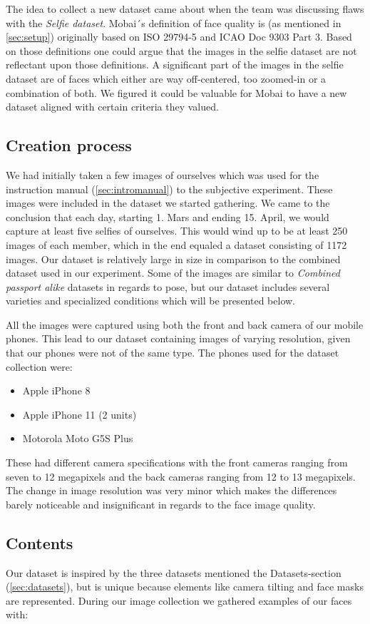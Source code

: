 The idea to collect a new dataset came about when the team was discussing flaws with the \textit{Selfie dataset}. Mobai´s definition of face quality is (as mentioned in \ref{sec:setup}) originally based on ISO 29794-5 and ICAO Doc 9303 Part 3. Based on those definitions one could argue that the images in the selfie dataset are not reflectant upon those definitions. A significant part of the images in the selfie dataset are of faces which either are way off-centered, too zoomed-in or a combination of both. We figured it could be valuable for Mobai to have a new dataset aligned with certain criteria they valued. 

\subsection*{Creation process}
We had initially taken a few images of ourselves which was used for the instruction manual (\ref{sec:intromanual}) to the subjective experiment. These images were included in the dataset we started gathering. We came to the conclusion that each day, starting 1. Mars and ending 15. April, we would capture at least five selfies of ourselves. This would wind up to be at least 250 images of each member, which in the end equaled a dataset consisting of 1172 images. Our dataset is relatively large in size in comparison to the combined dataset used in our experiment. Some of the images are similar to \textit{Combined passport alike} datasets in regards to pose, but our dataset includes several varieties and specialized conditions which will be presented below. 

All the images were captured using both the front and back camera of our mobile phones. This lead to our dataset containing images of varying resolution, given that our phones were not of the same type. The phones used for the dataset collection were:
\begin{itemize}
    \item Apple iPhone 8 
    \item Apple iPhone 11 (2 units)
    \item Motorola Moto G5S Plus 
\end{itemize}
These had different camera specifications with the front cameras ranging from seven to 12 megapixels and the back cameras ranging from 12 to 13 megapixels. The change in image resolution was very minor which makes the differences barely noticeable and insignificant in regards to the face image quality.

\subsection*{Contents}
Our dataset is inspired by the three datasets mentioned the Datasets-section (\ref{sec:datasets}), but is unique because elements like camera tilting and face masks are represented. During our image collection we gathered examples of our faces with: 

